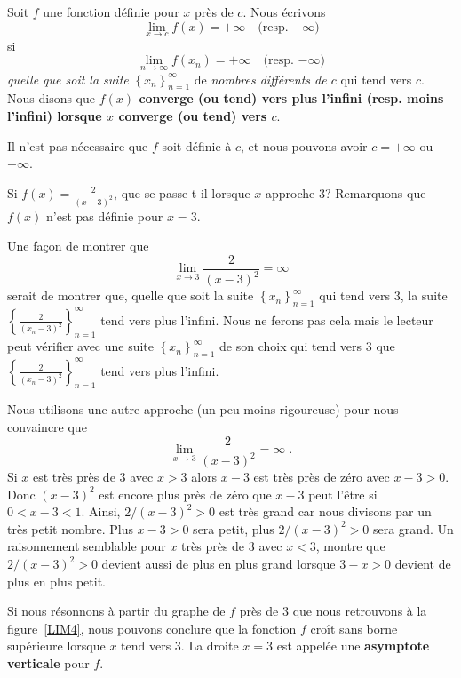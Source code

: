 {\begin{focus}{\dfn} 
Soit $f$ une fonction définie pour $x$ près de $c$.  Nous écrivons
\[
\lim_{x\rightarrow c} f(x) = +\infty  \quad \text{(resp. $-\infty$)}
\]
si
\[
\lim_{n\rightarrow \infty} f(x_n) = +\infty  \quad \text{(resp. $-\infty$)} 
\]
{\em quelle que soit la suite}
$\displaystyle \left\{x_n\right\}_{n=1}^\infty$ de
{\em nombres différents de $c$} qui tend vers $c$.
Nous disons que {\bfseries $f(x)$ converge (ou tend) vers plus l'infini
(resp. moins l'infini) lorsque $x$ converge (ou tend) vers $c$}.

Il n'est pas nécessaire que $f$ soit définie à $c$, et nous pouvons avoir
$c = +\infty$ ou $-\infty$.
\label{def_of_inf_lim_of_f}
\end{focus}

\begin{egg}
Si $\displaystyle f(x) = \frac{2}{(x-3)^2}$, que se passe-t-il lorsque
$x$ approche $3$?  Remarquons que $f(x)$ n'est pas définie pour
$x=3$.

Une façon de montrer que
\[
\lim_{x\rightarrow 3} \frac{2}{(x-3)^2} = \infty
\]
serait de montrer que, quelle que soit la suite
$\displaystyle \left\{x_n\right\}_{n=1}^\infty$ qui tend vers $3$, la
suite
$\displaystyle \left\{\frac{2}{(x_n-3)^2}\right\}_{n=1}^\infty$
tend vers plus l'infini.   Nous ne ferons pas cela mais le lecteur
peut vérifier avec une suite
$\displaystyle \left\{x_n\right\}_{n=1}^\infty$
de son choix qui tend vers $3$ que
$\displaystyle \left\{\frac{2}{(x_n-3)^2}\right\}_{n=1}^\infty$
tend vers plus l'infini.

Nous utilisons une autre approche (un peu moins rigoureuse) pour nous
convaincre que
\[
\lim_{x\rightarrow 3} \frac{2}{(x-3)^2} = \infty \; .
\]
Si $x$ est très près de $3$ avec $x>3$ alors $x-3$ est très près de
zéro avec $x-3>0$.  Donc $(x-3)^2$ est encore plus près de zéro que
$x-3$ peut l'être si $0<x-3<1$.  Ainsi, $2/(x-3)^2 >0$ est très grand
car nous divisons par un très petit nombre.   Plus $x-3>0$ sera petit, plus
$2/(x-3)^2 >0$ sera grand.  Un raisonnement semblable
pour $x$ très près de $3$ avec $x<3$, montre que $2/(x-3)^2>0$ devient
aussi de plus en plus grand lorsque $3-x>0$ devient de plus en plus
petit.

Si nous résonnons à partir du graphe de $f$ près de $3$ que nous retrouvons
à la figure~\ref{LIM4}, nous pouvons conclure que la fonction $f$ croît
sans borne supérieure lorsque $x$ tend vers $3$.  La droite $x=3$ est
appelée une
{\bfseries asymptote verticale} pour $f$. 
\end{egg}

}

